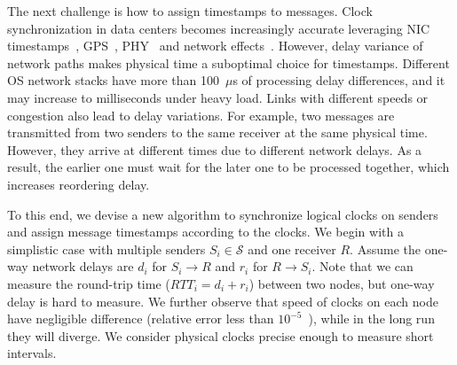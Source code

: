 
The next challenge is how to assign timestamps to messages.
Clock synchronization in data centers becomes increasingly accurate leveraging NIC timestamps~\cite{correll2005design}, GPS~\cite{corbett2013spanner}, PHY~\cite{lee2016globally} and network effects~\cite{geng2018exploiting}.
However, delay variance of network paths makes physical time a suboptimal choice for timestamps.
Different OS network stacks have more than 100~$\mu$s of processing delay differences, and it may increase to milliseconds under heavy load.
Links with different speeds or congestion also lead to delay variations.
For example, two messages are transmitted from two senders to the same receiver at the same physical time.
However, they arrive at different times due to different network delays.
As a result, the earlier one must wait for the later one to be processed together, which increases reordering delay.

To this end, we devise a new algorithm to synchronize logical clocks on senders and assign message timestamps according to the clocks.
We begin with a simplistic case with multiple senders $S_i \in \mathcal{S}$ and one receiver $R$.
Assume the one-way network delays are $d_i$ for $S_i \rightarrow R$ and $r_i$ for $R \rightarrow S_i$.
Note that we can measure the round-trip time ($RTT_i = d_i + r_i$) between two nodes, but one-way delay is hard to measure.
We further observe that speed of clocks on each node have negligible difference (relative error less than $10^{-5}$~\cite{corbett2013spanner,geng2018exploiting}), while in the long run they will diverge.
We consider physical clocks precise enough to measure short intervals.

